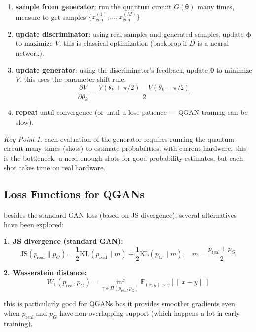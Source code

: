 \documentclass[11pt,a4paper]{article}
\theoremstyle{definition}
\theoremstyle{remark}
\newtheorem*{keypoint}{Key Point}
\begin{document}
\begin{enumerate}[label=\textbf{Step \arabic*:}]
    \item \textbf{sample from generator}: run the quantum circuit $G(\boldsymbol{\theta})$ many times, measure to get samples $\{x_{\text{gen}}^{(1)}, \ldots, x_{\text{gen}}^{(M)}\}$

    \item \textbf{update discriminator}: using real samples and generated samples, update $\boldsymbol{\phi}$ to maximize $V$. this is classical optimization (backprop if $D$ is a neural network).

    \item \textbf{update generator}: using the discriminator's feedback, update $\boldsymbol{\theta}$ to minimize $V$. this uses the parameter-shift rule:
    \[
    \frac{\partial V}{\partial \theta_k} = \frac{V(\theta_k + \pi/2) - V(\theta_k - \pi/2)}{2}
    \]

    \item \textbf{repeat} until convergence (or until u lose patience --- QGAN training can be slow).
\end{enumerate}

\begin{keypoint}
each evaluation of the generator requires running the quantum circuit many times (shots) to estimate probabilities. with current hardware, this is the bottleneck. u need enough shots for good probability estimates, but each shot takes time on real hardware.
\end{keypoint}

\subsection{Loss Functions for QGANs}

besides the standard GAN loss (based on JS divergence), several alternatives have been explored:

\textbf{1. JS divergence (standard GAN):}
\[
\text{JS}(p_{\text{real}} \| p_G) = \frac{1}{2} \text{KL}(p_{\text{real}} \| m) + \frac{1}{2} \text{KL}(p_G \| m), \quad m = \frac{p_{\text{real}} + p_G}{2}
\]

\textbf{2. Wasserstein distance:}
\[
W_1(p_{\text{real}}, p_G) = \inf_{\gamma \in \Pi(p_{\text{real}}, p_G)} \mathbb{E}_{(x,y) \sim \gamma}[\|x - y\|]
\]

this is particularly good for QGANs bcs it provides smoother gradients even when $p_{\text{real}}$ and $p_G$ have non-overlapping support (which happens a lot in early training).
\end{document}

